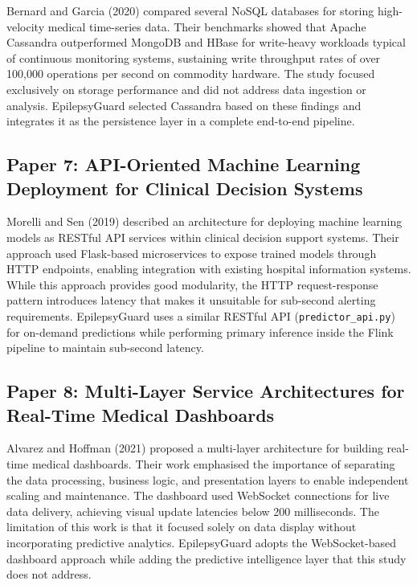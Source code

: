 \documentclass[12pt, a4paper, oneside]{report}
\begin{document}
Bernard and Garcia (2020) compared several NoSQL databases for storing high-velocity medical time-series data. Their benchmarks showed that Apache Cassandra outperformed MongoDB and HBase for write-heavy workloads typical of continuous monitoring systems, sustaining write throughput rates of over 100,000 operations per second on commodity hardware. The study focused exclusively on storage performance and did not address data ingestion or analysis. EpilepsyGuard selected Cassandra based on these findings and integrates it as the persistence layer in a complete end-to-end pipeline.

\subsection{Paper 7: API-Oriented Machine Learning Deployment for Clinical Decision Systems}

Morelli and Sen (2019) described an architecture for deploying machine learning models as RESTful API services within clinical decision support systems. Their approach used Flask-based microservices to expose trained models through HTTP endpoints, enabling integration with existing hospital information systems. While this approach provides good modularity, the HTTP request-response pattern introduces latency that makes it unsuitable for sub-second alerting requirements. EpilepsyGuard uses a similar RESTful API (\texttt{predictor\_api.py}) for on-demand predictions while performing primary inference inside the Flink pipeline to maintain sub-second latency.

\subsection{Paper 8: Multi-Layer Service Architectures for Real-Time Medical Dashboards}

Alvarez and Hoffman (2021) proposed a multi-layer architecture for building real-time medical dashboards. Their work emphasised the importance of separating the data processing, business logic, and presentation layers to enable independent scaling and maintenance. The dashboard used WebSocket connections for live data delivery, achieving visual update latencies below 200 milliseconds. The limitation of this work is that it focused solely on data display without incorporating predictive analytics. EpilepsyGuard adopts the WebSocket-based dashboard approach while adding the predictive intelligence layer that this study does not address.
\end{document}
